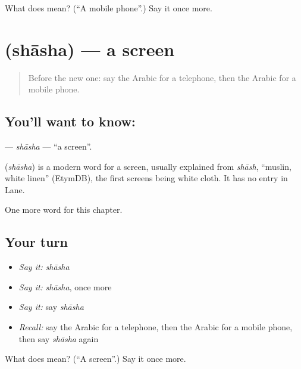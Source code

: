 \begin{tcolorbox}[breakable,colback=teal!4,colframe=teal!35!black,title={Before you move on}]
What does  mean? (\textquotedblleft{}A mobile phone\textquotedblright{}.) Say it once more.
\end{tcolorbox}
\section[\texorpdfstring{\ar{شاشة} (shāsha)}{شاشة (shāsha)}]{ (shāsha) — a screen}

\label{lesson:AR-C245-shasha}



\begin{quote}
Before the new one: say the Arabic for a telephone, then the Arabic for a mobile phone.
\end{quote}

\subsection*{You'll want to know: }
\textbf{} — \emph{shāsha} — \textquotedblleft{}a screen\textquotedblright{}.

\begin{cousinweb}
\textbf{} (\emph{shāsha}) is a modern word for a screen, usually explained from \emph{shāsh}, \textquotedblleft{}muslin, white linen\textquotedblright{} (EtymDB), the first screens being white cloth. It has no entry in Lane.
\end{cousinweb}

\begin{grammarlens}[title={What you've built}]
One more word for this chapter.
\end{grammarlens}

\subsection*{Your turn}
\begin{itemize}
\raggedright
  \item \emph{Say it:} \emph{shāsha}
  \item \emph{Say it:} \emph{shāsha}, once more
  \item \emph{Say it:} say \emph{shāsha}
  \item \emph{Recall:} say the Arabic for a telephone, then the Arabic for a mobile phone, then say \emph{shāsha} again
\end{itemize}

\begin{tcolorbox}[breakable,colback=teal!4,colframe=teal!35!black,title={Before you move on}]
What does  mean? (\textquotedblleft{}A screen\textquotedblright{}.) Say it once more.
\end{tcolorbox}
